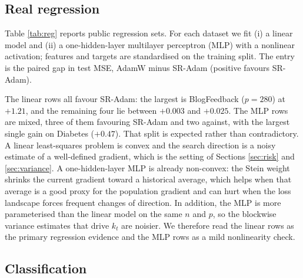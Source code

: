 \documentclass[a4paper,fleqn]{cas-dc}
\theoremstyle{plain}
\theoremstyle{definition}
\theoremstyle{remark}
\begin{document}
\subsection{Real regression}

Table \ref{tab:reg} reports public regression sets. For each dataset we fit (i) a linear model and (ii) a one-hidden-layer multilayer perceptron (MLP) with a nonlinear activation; features and targets are standardised on the training split. The entry is the paired gap in test MSE, AdamW minus SR-Adam (positive favours SR-Adam).

The linear rows all favour SR-Adam: the largest is BlogFeedback ($p=280$) at $+1.21$, and the remaining four lie between $+0.003$ and $+0.025$. The MLP rows are mixed, three of them favouring SR-Adam and two against, with the largest single gain on Diabetes ($+0.47$). That split is expected rather than contradictory. A linear least-squares problem is convex and the search direction is a noisy estimate of a well-defined gradient, which is the setting of Sections \ref{sec:risk} and \ref{sec:variance}. A one-hidden-layer MLP is already non-convex: the Stein weight shrinks the current gradient toward a historical average, which helps when that average is a good proxy for the population gradient and can hurt when the loss landscape forces frequent changes of direction. In addition, the MLP is more parameterised than the linear model on the same $n$ and $p$, so the blockwise variance estimates that drive $k_t$ are noisier. We therefore read the linear rows as the primary regression evidence and the MLP rows as a mild nonlinearity check.

\begin{table}%
\centering
\caption{Regression on public tabular sets. Gap in test MSE, AdamW minus SR-Adam; bold positive entries favour SR-Adam. \emph{Model} is either a linear regressor or a one-hidden-layer MLP (nonlinear).}
\label{tab:reg}

\end{table}

\subsection{Classification}
\end{document}
